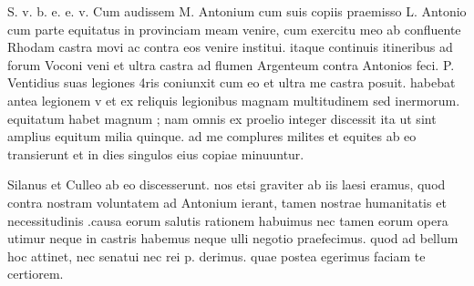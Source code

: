 


 S. v. b. e. e. v. Cum audissem M. Antonium cum suis copiis praemisso L. Antonio cum parte equitatus in provinciam meam venire, cum exercitu meo ab confluente Rhodam castra movi ac contra eos venire institui. itaque continuis itineribus ad forum Voconi veni et ultra castra ad flumen Argenteum contra Antonios feci. P. Ventidius suas legiones 4ris coniunxit cum eo et ultra me castra posuit. habebat antea legionem v et ex reliquis legionibus magnam multitudinem sed inermorum. equitatum habet magnum ; nam omnis ex proelio integer discessit ita ut sint amplius equitum milia quinque. ad me complures milites et equites ab eo transierunt et in dies singulos eius copiae minuuntur.

 Silanus et Culleo ab eo discesserunt. nos etsi graviter ab iis laesi eramus, quod contra nostram voluntatem ad Antonium ierant, tamen nostrae humanitatis et necessitudinis .causa eorum salutis rationem habuimus nec tamen eorum opera utimur neque in castris habemus neque ulli negotio praefecimus. quod ad bellum hoc attinet, nec senatui nec rei p. derimus. quae postea egerimus faciam te certiorem.
